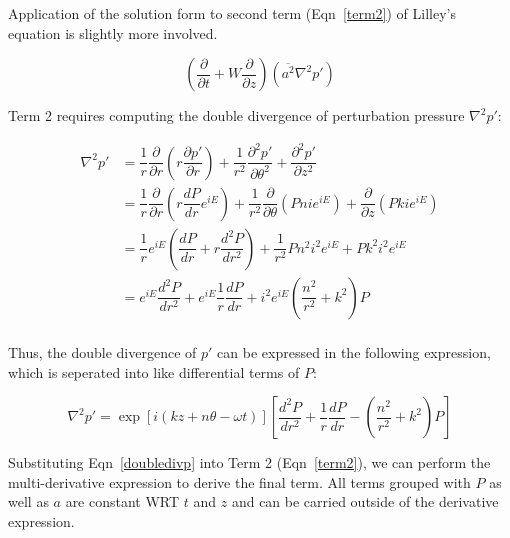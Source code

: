 \documentclass[]{aiaa-tc}%
\begin{document}
Application of the solution form to second term (Eqn~\ref{term2}) of Lilley's equation is slightly more involved.

\begin{equation}\label{term2}
\left( \dfrac{\partial}{\partial t} + W \dfrac{\partial}{\partial z} \right) (\overline{a^2}\nabla^2p')
\end{equation}

Term 2 requires computing the double divergence of perturbation pressure $\nabla^2 p'$:

\begin{align*}
\nabla^2p'
  &= \dfrac{1}{r}\dfrac{\partial}{\partial r} \left( r\dfrac{\partial p'}{\partial r} \right)
      + \dfrac{1}{r^2} \dfrac{\partial^2 p'}{\partial \theta^2}
      + \dfrac{\partial^2 p'}{\partial z^2} \\
&= \dfrac{1}{r}\dfrac{\partial}{\partial r} \left( r \dfrac{dP}{dr} e^{iE} \right)
      + \dfrac{1}{r^2} \dfrac{\partial }{\partial \theta} \left( Pn ie^{iE} \right)
      + \dfrac{\partial}{\partial z} \left( Pk ie^{iE} \right) \\
&= \dfrac{1}{r} e^{iE} \left(
    \dfrac{dP}{dr} + r \dfrac{d^2P}{dr^2} \right)
      + \dfrac{1}{r^2} Pn^2 i^2 e^{iE}
      + Pk^2 i^2  e^{iE} \\
&= e^{iE} \dfrac{d^2P}{dr^2}
    + e^{iE} \dfrac{1}{r} \dfrac{dP}{dr}
    + i^2 e^{iE} \left( \dfrac{n^2}{r^2} + k^2 \right) P \\
\end{align*}

Thus, the double divergence of $p'$ can be expressed in the following expression, which is seperated into like differential terms of $P$:

\begin{equation} \label{doubledivp}
\boxed{ \nabla^2p'= \exp[i(kz + n\theta -\omega t)] \left[
      \dfrac{d^2P}{dr^2}
    + \dfrac{1}{r} \dfrac{dP}{dr}
    - \left( \dfrac{n^2}{r^2} + k^2 \right) P \right] }
\end{equation}

Substituting Eqn~\ref{doubledivp} into Term 2 (Eqn~\ref{term2}), we can perform the multi-derivative expression to derive the final term.  All terms grouped with $P$ as well as $a$ are constant WRT $t$ and $z$ and can be carried outside of the derivative expression.
\end{document}
